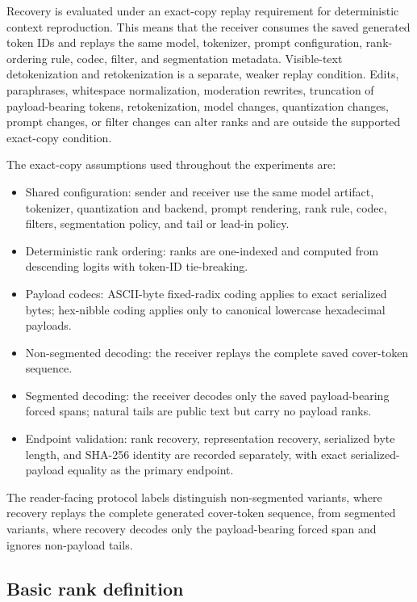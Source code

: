 \documentclass[fleqn,10pt]{wlscirep}
\begin{document}
Recovery is evaluated under an exact-copy replay requirement for deterministic context reproduction. This means that the receiver consumes the saved generated token IDs and replays the same model, tokenizer, prompt configuration, rank-ordering rule, codec, filter, and segmentation metadata. Visible-text detokenization and retokenization is a separate, weaker replay condition. Edits, paraphrases, whitespace normalization, moderation rewrites, truncation of payload-bearing tokens, retokenization, model changes, quantization changes, prompt changes, or filter changes can alter ranks and are outside the supported exact-copy condition.

The exact-copy assumptions used throughout the experiments are:
\begin{itemize}
\item Shared configuration: sender and receiver use the same model artifact, tokenizer, quantization and backend, prompt rendering, rank rule, codec, filters, segmentation policy, and tail or lead-in policy.
\item Deterministic rank ordering: ranks are one-indexed and computed from descending logits with token-ID tie-breaking.
\item Payload codecs: ASCII-byte fixed-radix coding applies to exact serialized bytes; hex-nibble coding applies only to canonical lowercase hexadecimal payloads.
\item Non-segmented decoding: the receiver replays the complete saved cover-token sequence.
\item Segmented decoding: the receiver decodes only the saved payload-bearing forced spans; natural tails are public text but carry no payload ranks.
\item Endpoint validation: rank recovery, representation recovery, serialized byte length, and SHA-256 identity are recorded separately, with exact serialized-payload equality as the primary endpoint.
\end{itemize}
The reader-facing protocol labels distinguish non-segmented variants, where recovery replays the complete generated cover-token sequence, from segmented variants, where recovery decodes only the payload-bearing forced span and ignores non-payload tails.


\subsection*{Basic rank definition}\label{sec:rank-method}
\end{document}
